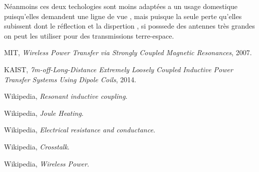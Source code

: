 \documentclass[12pt]{report}
\begin{document}
  Néanmoins ces deux techologies sont moins adaptées a un usage domestique puisqu'elles demandent une ligne de vue , mais puisque la seule perte qu'elles subissent dont le réflection et la dispertion , si posssede des antennes très grandes on peut les utiliser pour des transmissions terre-espace.
\begin{thebibliography}{9}
    
  MIT,
  \emph{Wireless Power Transfer via Strongly Coupled Magnetic Resonances},
  2007.

  KAIST,
  \emph{7m-off-Long-Distance Extremely Loosely Coupled Inductive Power Transfer Systems Using Dipole Coils},
  2014.
  
  Wikipedia,
  \emph{Resonant inductive coupling}.
  
  Wikipedia,
  \emph{Joule Heating}.
  
  Wikipedia,
  \emph{Electrical resistance and conductance}.
  
  Wikipedia,
  \emph{Crosstalk}.
  
  Wikipedia,
  \emph{Wireless Power}.
  
\end{thebibliography}
\end{document}
